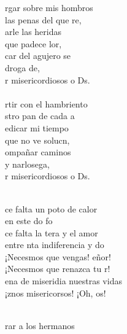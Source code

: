 \begin{cancion}%
	rgar sobre mis hombros \\
	 las penas del que re,\\
	arle las heridas\\
	 que padece lor,\\
	car del agujero se \\
	 droga de,\\
	r misericordiosos o Ds.\\
\jump\\
	rtir con el hambriento \\
	stro pan de cada a\\
	edicar mi tiempo \\
	 que no ve solucn, \\
	ompañar caminos \\
	y narlosega,\\
	r misericordiosos o Ds.\\\jump\\
	\begin{chorus}%
	ce falta un poto de calor \\
	en este do fo\\
	ce falta la tera y el amor \\
	entre nta indiferencia y do\\
	¡Necesmos que vengas! eñor!\\
	¡Necesmos que renazca tu r!\\
	ena de miseridia nuestras vidas\\
	¡znos misericorsos! ¡Oh, os! \\
	\end{chorus}%
	\jump\\
	rar a los hermanos \\

\end{cancion}
